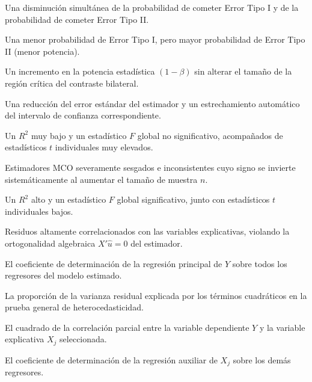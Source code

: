 \begin{opts}
    \item Una disminución simultánea de la probabilidad de cometer Error Tipo I y de la probabilidad de cometer Error Tipo II.
    \item Una menor probabilidad de Error Tipo I, pero mayor probabilidad de Error Tipo II (menor potencia).
    \item Un incremento en la potencia estadística $(1 - \beta)$ sin alterar el tamaño de la región crítica del contraste bilateral.
    \item Una reducción del error estándar del estimador y un estrechamiento automático del intervalo de confianza correspondiente.
\end{opts}

\begin{opts}
    \item Un $R^2$ muy bajo y un estadístico $F$ global no significativo, acompañados de estadísticos $t$ individuales muy elevados.
    \item Estimadores MCO severamente sesgados e inconsistentes cuyo signo se invierte sistemáticamente al aumentar el tamaño de muestra $n$.
    \item Un $R^2$ alto y un estadístico $F$ global significativo, junto con estadísticos $t$ individuales bajos.
    \item Residuos altamente correlacionados con las variables explicativas, violando la ortogonalidad algebraica $X'\hat{u} = 0$ del estimador.
\end{opts}

\begin{opts}
    \item El coeficiente de determinación de la regresión principal de $Y$ sobre todos los regresores del modelo estimado.
    \item La proporción de la varianza residual explicada por los términos cuadráticos en la prueba general de heterocedasticidad.
    \item El cuadrado de la correlación parcial entre la variable dependiente $Y$ y la variable explicativa $X_j$ seleccionada.
    \item El coeficiente de determinación de la regresión auxiliar de $X_j$ sobre los demás regresores.
\end{opts}

